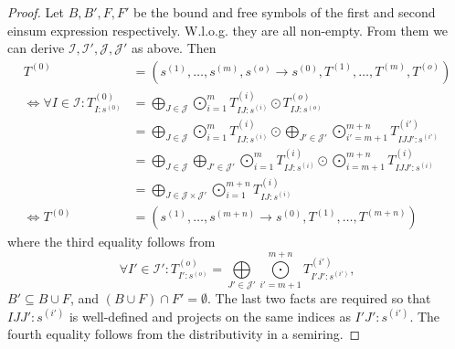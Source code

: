 \begin{proof}
    Let $B, B', F, F'$ be the bound and free symbols of the first and second einsum expression respectively.
    W.l.o.g. they are all non-empty.
    From them we can derive $\mathcal{I}, \mathcal{I}', \mathcal{J}, \mathcal{J}'$ as above.
    Then
    \begin{align*}
        T^{(0)}                                              & = (s^{(1)},\dots,s^{(m)}, s^{(o)} \rightarrow s^{(0)}, T^{(1)},\dots,T^{(m)}, T^{(o)})                                                                                                             \\
        \iff \forall I \in \mathcal{I}: T^{(0)}_{I: s^{(0)}} & = \bigoplus\limits_{J \in \mathcal{J}} \bigodot\limits_{i = 1}^{m} T^{(i)}_{IJ:s^{(i)}} \odot T^{(o)}_{IJ:s^{(o)}}                                                                                 \\
                                                             & = \bigoplus\limits_{J \in \mathcal{J}} \bigodot\limits_{i = 1}^{m} T^{(i)}_{IJ:s^{(i)}} \odot \bigoplus\limits_{J' \in \mathcal{J}'} \bigodot\limits_{i' = m + 1}^{m + n} T^{(i')}_{IJJ':s^{(i')}} \\
                                                             & = \bigoplus\limits_{J \in \mathcal{J}} \bigoplus\limits_{J' \in \mathcal{J}'} \bigodot\limits_{i = 1}^{m} T^{(i)}_{IJ:s^{(i)}} \odot \bigodot\limits_{i = m + 1}^{m + n} T^{(i)}_{IJJ':s^{(i)}}    \\
                                                             & = \bigoplus\limits_{J \in \mathcal{J} \times \mathcal{J}'} \bigodot\limits_{i = 1}^{m + n} T^{(i)}_{IJ:s^{(i)}}                                                                                    \\
        \iff T^{(0)}                                         & = (s^{(1)}, \dots, s^{(m + n)} \rightarrow s^{(0)}, T^{(1)}, \dots, T^{(m + n)})
    \end{align*}
    where the third equality follows from
    $$\forall I' \in \mathcal{I}': T^{(o)}_{I': s^{(o)}} = \bigoplus\limits_{J' \in \mathcal{J}'} \bigodot\limits_{i' = m + 1}^{m + n} T^{(i')}_{I'J':s^{(i')}},$$
    $B' \subseteq B \cup F$, and $(B \cup F) \cap F' = \emptyset$. The last two facts are required so that $IJJ':s^{(i')}$ is well-defined and projects on the same indices as $I'J':s^{(i')}$.
    The fourth equality follows from the distributivity in a semiring.
\end{proof}

